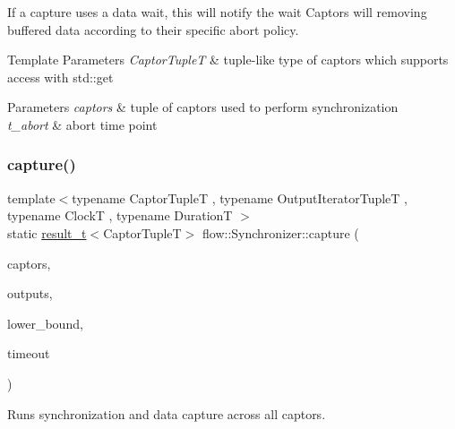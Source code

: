 If a capture uses a data wait, this will notify the wait Captors will removing buffered data according to their specific abort policy.


\begin{DoxyTemplParams}{Template Parameters}
{\em Captor\+TupleT} & tuple-\/like type of captors which supports access with {\ttfamily std\+::get}\\
\hline
\end{DoxyTemplParams}

\begin{DoxyParams}{Parameters}
{\em captors} & tuple of captors used to perform synchronization \\
\hline
{\em t\+\_\+abort} & abort time point \\
\hline
\end{DoxyParams}
\mbox{\label{classflow_1_1_synchronizer_af8bda24c2e5ea24037d8fcaceda96885}} 
\subsubsection{\texorpdfstring{capture()}{capture()}\hspace{0.1cm}{\footnotesize\ttfamily [1/2]}}
{\footnotesize\ttfamily template$<$typename Captor\+TupleT , typename Output\+Iterator\+TupleT , typename ClockT , typename DurationT $>$ \\
static \hyperlink{classflow_1_1_synchronizer_a4f9693650274ae93f5b9a11cb41a2d80}{result\+\_\+t}$<$Captor\+TupleT$>$ flow\+::\+Synchronizer\+::capture (\begin{DoxyParamCaption}\item[{Captor\+TupleT \&\&}]{captors,  }\item[{Output\+Iterator\+TupleT \&\&}]{outputs,  }\item[{const \hyperlink{classflow_1_1_synchronizer_a0f1e7062475c9492191e29b26d09106c}{stamp\+\_\+arg\+\_\+t}$<$ Captor\+TupleT $>$}]{lower\+\_\+bound,  }\item[{const std\+::chrono\+::time\+\_\+point$<$ ClockT, DurationT $>$ \&}]{timeout }\end{DoxyParamCaption})\hspace{0.3cm}{\ttfamily [static]}}



Runs synchronization and data capture across all captors. 


